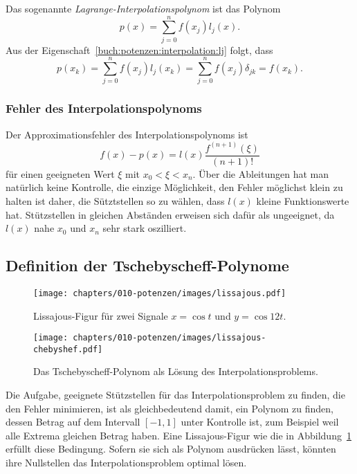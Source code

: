 %
Das sogenannte {\em Lagrange-Interpolationspolynom} ist das Polynom
\[
p(x)
=
\sum_{j=0}^n f(x_j) l_j(x).
\]
Aus der Eigenschaft~\eqref{buch:potenzen:interpolation:lj} folgt, dass
\[
p(x_k)
=
\sum_{j=0}^n f(x_j) l_j(x_k)
=
\sum_{j=0}^n f(x_j) \delta_{jk}
=
f(x_k).
\]

%
%
\subsubsection{Fehler des Interpolationspolynoms}
Der Approximationsfehler des Interpolationspolynoms ist
\[
f(x)-p(x)
=
l(x) \frac{f^{(n+1)}(\xi)}{(n+1)!}
\]
für einen geeigneten Wert $\xi$ mit $x_0 < \xi < x_n$.
Über die Ableitungen hat man natürlich keine Kontrolle, die einzige 
Möglichkeit, den Fehler möglichst klein zu halten ist daher,
die Sütztstellen so zu wählen, dass $l(x)$ kleine Funktionswerte hat.
Stützstellen in gleichen Abständen erweisen sich dafür als ungeeignet,
da $l(x)$ nahe $x_0$ und $x_n$ sehr stark oszilliert.

%
%
\subsection{Definition der Tschebyscheff-Polynome
\label{sub:definiton_der_tschebyscheff-Polynome}}
\begin{figure}
\centering
\texttt{[image: chapters/010-potenzen/images/lissajous.pdf]}
\caption{Lissajous-Figur für zwei Signale $x=\cos t$ und $y=\cos 12t$.
\label{buch:potenzen:interpolation:lissajous}}
\end{figure}
\begin{figure}
\centering
\texttt{[image: chapters/010-potenzen/images/lissajous-chebyshef.pdf]}
\caption{Das Tschebyscheff-Polynom als Lösung des Interpolationsproblems.
\label{buch:potenzen:interpolation:lissajous-tschebyscheff}}
\end{figure}
Die Aufgabe, geeignete Stützstellen für das Interpolationsproblem zu finden,
die den Fehler minimieren, ist als gleichbedeutend damit, ein Polynom
zu finden, dessen Betrag auf dem Intervall $[-1,1]$ unter Kontrolle ist,
zum Beispiel weil alle Extrema gleichen Betrag haben.
Eine Lissajous-Figur wie die in
Abbildung~\ref{buch:potenzen:interpolation:lissajous} erfüllt
diese Bedingung.
Sofern sie sich als Polynom ausdrücken lässt, könnten ihre Nullstellen
das Interpolationsproblem optimal lösen.

